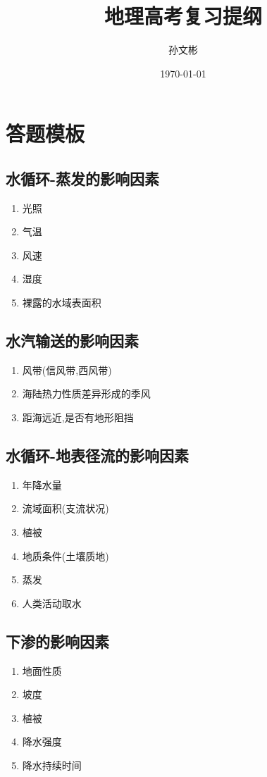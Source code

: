 \documentclass[a4paper]{article}
\title{地理高考复习提纲}
\author{孙文彬}
\date{\today}
\begin{document}
    \maketitle%
    \newpage
    \tableofcontents%
    \newpage
    \section{答题模板}
    \subsection{水循环-蒸发的影响因素}
    \begin{enumerate}
        \item 光照
        \item 气温
        \item 风速
        \item 湿度
        \item 裸露的水域表面积
    \end{enumerate}
    \subsection{水汽输送的影响因素}
    \begin{enumerate}
        \item 风带(信风带,西风带)
        \item 海陆热力性质差异形成的季风
        \item 距海远近,是否有地形阻挡
    \end{enumerate}
    \subsection{水循环-地表径流的影响因素}
    \begin{enumerate}
        \item 年降水量
        \item 流域面积(支流状况)
        \item 植被
        \item 地质条件(土壤质地)
        \item 蒸发
        \item 人类活动取水
    \end{enumerate}
    \subsection{下渗的影响因素}
    \begin{enumerate}
        \item 地面性质
        \item 坡度
        \item 植被
        \item 降水强度
        \item 降水持续时间
    \end{enumerate}
\end{document}

